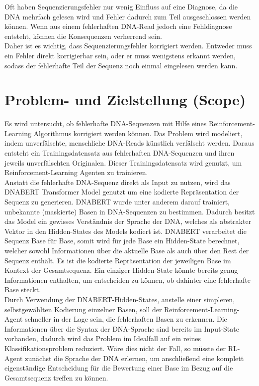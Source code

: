 \documentclass[oneside,bibliography=totocnumbered,BCOR=5mm]{scrbook}%
\theoremstyle{definition}
\theoremstyle{definition}
\theoremstyle{definition}
\theoremstyle{definition}
\theoremstyle{definition}
\theoremstyle{definition}
\begin{document}
Oft haben Sequenzierungsfehler nur wenig Einfluss auf eine Diagnose, da die DNA mehrfach gelesen wird und Fehler dadurch
zum Teil ausgeschlossen werden können.
Wenn aus einem fehlerhaften DNA-Read jedoch eine Fehldiagnose entsteht, können die Konsequenzen verherrend sein. \\


Daher ist es wichtig, dass Sequenzierungsfehler korrigiert werden. 
Entweder muss ein Fehler direkt korrigierbar sein, oder er muss wenigstens erkannt werden, 
sodass der fehlerhafte Teil der Sequenz noch einmal eingelesen werden kann. \\
\linebreak[4]


\section{Problem- und Zielstellung (Scope)}
Es wird untersucht, ob fehlerhafte DNA-Sequenzen mit Hilfe eines Reinforcement-Learning Algorithmus korrigiert werden können. 
Das Problem wird modeliert, indem unverfälschte, menschliche DNA-Reads künstlich verfälscht werden. 
Daraus entsteht ein Trainingsdatensatz aus fehlerhaften DNA-Sequenzen und ihren jeweils unverfälschten Originalen.
Dieser Trainingsdatensatz wird genutzt, um Reinforcement-Learning Agenten zu trainieren.\\


Anstatt die fehlerhafte DNA-Sequenz direkt als Input zu nutzen, wird das DNABERT Transformer Model genutzt um eine 
kodierte Repräsentation der Sequenz zu generieren. 
DNABERT wurde unter anderem darauf trainiert, unbekannte (maskierte) Basen in DNA-Sequenzen zu bestimmen. 
Dadurch besitzt das Model ein gewisses Verständnis der Sprache der DNA, 
welches als abstrakter Vektor in den Hidden-States des Models kodiert ist. 
DNABERT verarbeitet die Sequenz Base für Base, somit wird für jede Base ein Hidden-State berechnet,
welcher sowohl Informationen über die aktuelle Base als auch über den Rest der Sequenz enthält.
Es ist die kodierte Repräsentation der jeweiligen Base im Kontext der Gesamtsequenz.
Ein einziger Hidden-State könnte bereits genug Informationen enthalten, 
um entscheiden zu können, ob dahinter eine fehlerhafte Base steckt.\\


Durch Verwendung der DNABERT-Hidden-States, anstelle einer simpleren, selbstgewählten Kodierung einzelner Basen, 
soll der Reinforcement-Learning-Agent schneller in der Lage sein, die fehlerhaften Basen zu erkennen. 
Die Informationen über die Syntax der DNA-Sprache sind bereits im Input-State vorhanden, 
dadurch wird das Problem im Idealfall auf ein reines Klassifikationsproblem reduziert. 
Wäre dies nicht der Fall, so müsste der RL-Agent zunächst die Sprache der DNA erlernen, 
um anschließend eine komplett eigenständige Entscheidung für die Bewertung einer Base 
im Bezug auf die Gesamtsequenz treffen zu können.\\
\end{document}
